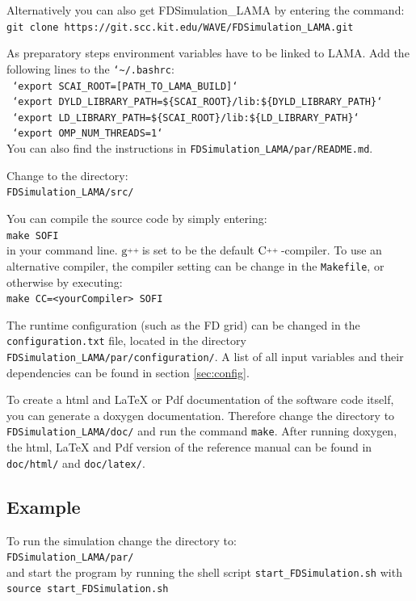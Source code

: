 \documentclass[pdftex,a4paper,parskip,listof=totoc,bibliography=totoc,onehalfspacing,12pt]{scrreprt}
\newcommand{\CC}[1][]{$\text{C\hspace{0ex}}^{_{_{_{++}}}}					%
                      \ifthenelse{\equal{#1}{}}{}{\text{\hspace{-.625ex}#1}}$}
\newcommand{\gCC}[1][]{$\text{g\hspace{0ex}}^{_{_{_{++}}}}				%
                      \ifthenelse{\equal{#1}{}}{}{\text{\hspace{-.25ex}(#1)}}$}
\newcommand{\shellcmd}[1]{\indent\indent\texttt{#1}}	%
\newcommand{\shellcmdline}[1]{\indent\indent\texttt{\quad#1}} 	%
\begin{document}
Alternatively you can also get FDSimulation\_LAMA by entering the command: \\\shellcmdline{git clone https://git.scc.kit.edu/WAVE/FDSimulation\_LAMA.git}

As preparatory steps environment variables have to be linked to LAMA. Add the following lines to the \shellcmd{{\char`\~}/.bashrc}:
\\\shellcmdline{ `export SCAI\_ROOT=[PATH\_TO\_LAMA\_BUILD]`}
\\\shellcmdline{ `export DYLD\_LIBRARY\_PATH=\$\{SCAI\_ROOT\}/lib:\$\{DYLD\_LIBRARY\_PATH\}`}
\\\shellcmdline{ `export LD\_LIBRARY\_PATH=\$\{SCAI\_ROOT\}/lib:\$\{LD\_LIBRARY\_PATH\}`}
\\\shellcmdline{ `export OMP\_NUM\_THREADS=1`}\\
You can also find the instructions in \shellcmd{FDSimulation\_LAMA/par/README.md}. 

Change to the directory: \\\shellcmdline{FDSimulation\_LAMA/src/}

You can compile the source code by simply entering: \\\shellcmdline{make SOFI}\\ in your command line. \gCC is set to be the default \CC-compiler. To use an alternative compiler, the compiler setting can be change in the \shellcmd{Makefile}, or otherwise by executing:\\\shellcmdline{make CC=<yourCompiler> SOFI}

The runtime configuration (such as the FD grid) can be changed in the \shellcmd{configuration.txt} file, located in the directory \shellcmd{FDSimulation\_LAMA/par/configuration/}. A list of all input variables and their dependencies can be found in section \ref{sec:config}. 

To create a html and LaTeX or Pdf documentation of the software code itself, you can generate a doxygen documentation. Therefore change the directory to \shellcmd{FDSimulation\_LAMA/doc/} and run the command \shellcmd{make}. After running doxygen, the html, LaTeX and Pdf version of the reference manual can be found in \shellcmd{doc/html/} and \shellcmd{doc/latex/}.

\subsection{Example}

To run the simulation change the directory to: \\\shellcmdline{FDSimulation\_LAMA/par/}\\
and start the program by running the shell script \shellcmd{start\_FDSimulation.sh} with  \\\shellcmdline{source start\_FDSimulation.sh}\\
\end{document}
